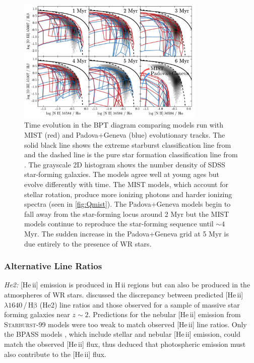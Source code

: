 \documentclass[twocolumn, tighten]{aastex61}
\newcommand{\Fig}[1]{\autoref{fig:#1}}
\newcommand{\SB}{\textsc{Starburst-99}\xspace}
\newcommand{\heii}{[He\,{\sc ii}]\xspace}
\newcommand{\hb}{\ensuremath{\mathrm{H\beta}}}
\newcommand{\hii}{H\,{\sc ii}\xspace}
\newcommand\lam[1]{\ensuremath{\lambda #1}}
\begin{document}
\begin{figure}
  \begin{centering}
    \includegraphics[width=0.8\textwidth]{f22.pdf}
    \caption{Time evolution in the BPT diagram comparing models run with MIST (red) and Padova+Geneva (blue) evolutionary tracks. The solid black line shows the extreme starburst classification line from \citet{Kewley01} and the dashed line is the pure star formation classification line from \citet{Kauffmann03a}. The  grayscale 2D histogram shows the number density of SDSS star-forming galaxies. The models agree well at young ages but evolve differently with time. The MIST models, which account for stellar rotation, produce more ionizing photons and harder ionizing spectra (seen in \Fig{Qmist}). The Padova+Geneva models begin to fall away from the star-forming locus around 2 Myr but the MIST models continue to reproduce the star-forming sequence until ${\sim}4$ Myr. The sudden increase in the Padova+Geneva grid at 5 Myr is due entirely to the presence of WR stars.}
    \label{fig:BPTmistAge}
  \end{centering}
\end{figure}

\subsubsection{Alternative Line Ratios}

{\it He2:} \heii emission is produced in \hii regions but can also be produced in the atmospheres of WR stars. \citet{Steidel16} discussed the discrepancy between predicted \heii\lam{1640}\,/\,\hb{} (He2) line ratios and those observed for a sample of massive star forming galaxies near $z\sim2$. Predictions for the nebular \heii{} emission from \SB{} models were too weak to match observed \heii{} line ratios. Only the BPASS models \citep{Eldridge12}, which include stellar and nebular \heii{} emission, could match the observed \heii{} flux, thus \citet{Steidel16} deduced that photospheric emission must also contribute to the \heii flux. 
\end{document}

